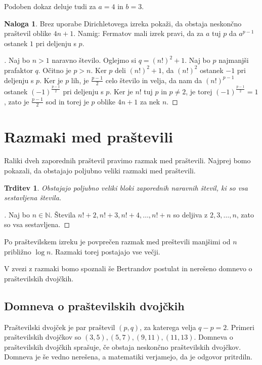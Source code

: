 \documentclass[a4paper,12pt]{article}
\def\N{\mathbb{N}}
\theoremstyle{definition}
\newtheorem{naloga}{Naloga}
\theoremstyle{plain}
\newtheorem{trditev}{Trditev}
\newenvironment{dokaz}{\begin{proof}[\bfseries\upshape\proofname]}{\end{proof}}
\begin{document}
Podoben dokaz deluje tudi za $a = 4$ in $b = 3$.

\begin{naloga}
    Brez uporabe Dirichletovega izreka pokaži, da obstaja neskončno praštevil oblike $4n + 1$.
    Namig: Fermatov mali izrek pravi, da za $a$ tuj $p$ da $a^{p - 1}$ ostanek $1$ pri deljenju s $p$.
\end{naloga}
\begin{dokaz}
    Naj bo $n > 1$ naravno število. Oglejmo si $q = (n!)^2 + 1$. Naj bo $p$ najmanjši prafaktor $q$. Očitno je $p > n$. Ker $p$ deli $(n!)^2 + 1$, da $(n!)^2$ ostanek $-1$ pri deljenju s $p$. Ker je $p$ lih, je $\frac{p - 1}{2}$ celo število in velja, da nam da $(n!)^{p - 1}$ ostanek $(-1)^{\frac{p - 1}{2}}$ pri deljenju s $p$. Ker je $n!$ tuj $p$ in $p \neq 2$, je torej $(-1)^{\frac{p - 1}{2}} = 1$, zato je $\frac{p - 1}{2}$ sod in torej je $p$ oblike $4n + 1$ za nek $n$.
\end{dokaz}



\section{Razmaki med praštevili}
Raliki dveh zaporednih praštevil pravimo razmak med praštevili. Najprej bomo pokazali, da obstajajo poljubno veliki razmaki med praštevili.

\begin{trditev}
    Obstajajo poljubno veliki bloki zaporednih naravnih števil, ki so vsa sestavljena števila.
\end{trditev}
\begin{dokaz}
    Naj bo $n \in \N$. Števila $n! + 2, n! + 3, n! + 4, \ldots, n! + n$ so deljiva z $2, 3, \ldots, n$, zato so vsa sestavljena.
\end{dokaz}

Po praštevilskem izreku je povprečen razmak med preštevili manjšimi od $n$ približno $\log{n}$. Razmaki torej postajajo vse večji.

V zvezi z razmaki bomo spoznali še Bertrandov postulat in nerešeno domnevo o praštevilskih dvojčkih.

\subsection{Domneva o praštevilskih dvojčkih}
Praštevilski dvojček je par praštevil $(p, q)$, za katerega velja $q - p = 2$. Primeri praštevilskih dvojčkov so $(3, 5), (5, 7), (9, 11), (11, 13)$. Domneva o praštevilskih dvojčkih sprašuje, če obstaja neskončno praštevilskih dvojčkov. Domneva je še vedno nerešena, a matematiki verjamejo, da je odgovor pritrdiln.
\end{document}
